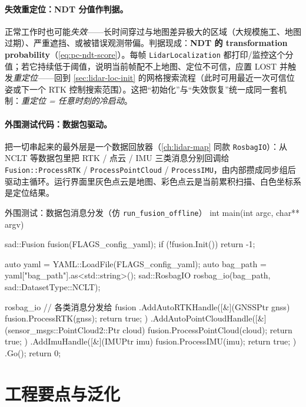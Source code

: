 \paragraph{失效重定位：NDT 分值作判据。}
正常工作时也可能\emph{失效}——长时间穿过与地图差异极大的区域（大规模施工、地图过期）、严重遮挡、或被错误观测带偏。判据现成：\textbf{NDT 的 transformation probability}（\cref{eq:pc-ndt-score}）。每帧 \texttt{LidarLocalization} 都打印/监控这个分值；若它持续低于阈值，说明当前帧配不上地图、定位不可信，应置 \textsf{LOST} 并触发\emph{重定位}——回到 \cref{sec:lidar-loc-init} 的网格搜索流程（此时可用最近一次可信位姿或下一个 RTK 控制搜索范围）。这把“初始化”与“失效恢复”统一成同一套机制：\emph{重定位 = 任意时刻的冷启动}。

\paragraph{外围测试代码：数据包驱动。}
把一切串起来的最外层是一个数据回放器（\cref{ch:lidar-map} 同款 \texttt{RosbagIO}）：从 NCLT 等数据包里把 RTK / 点云 / IMU 三类消息分别回调给 \texttt{Fusion::ProcessRTK} / \texttt{ProcessPointCloud} / \texttt{ProcessIMU}，由内部攒成同步组后驱动主循环。运行界面里灰色点云是地图、彩色点云是当前累积扫描、白色坐标系是定位结果。

\begin{codebox}[C++]{外围测试：数据包消息分发（仿 \texttt{run\_fusion\_offline}）}
int main(int argc, char** argv) {
  sad::Fusion fusion(FLAGS_config_yaml);
  if (!fusion.Init()) return -1;

  auto yaml = YAML::LoadFile(FLAGS_config_yaml);
  auto bag_path = yaml["bag_path"].as<std::string>();
  sad::RosbagIO rosbag_io(bag_path, sad::DatasetType::NCLT);

  rosbag_io                                            // 各类消息分发给 fusion
    .AddAutoRTKHandle([&](GNSSPtr gnss)  { fusion.ProcessRTK(gnss);  return true; })
    .AddAutoPointCloudHandle([&](sensor_msgs::PointCloud2::Ptr cloud) {
        fusion.ProcessPointCloud(cloud); return true; })
    .AddImuHandle([&](IMUPtr imu)        { fusion.ProcessIMU(imu);   return true; })
    .Go();
  return 0;
}
\end{codebox}

\section{工程要点与泛化}
\label{sec:lidar-loc-eng}

